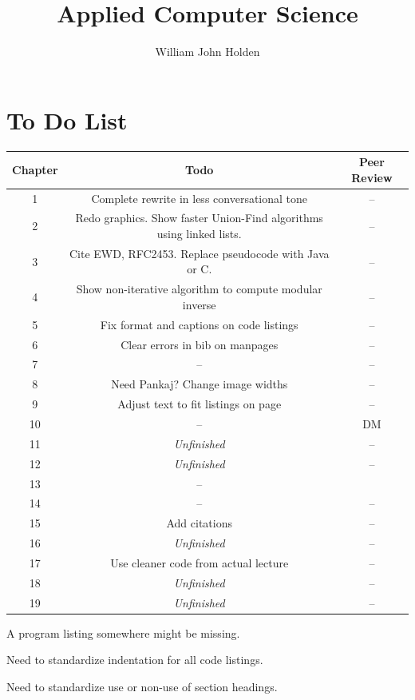 \documentclass{book}
\title{Applied Computer Science}
\author{William John Holden}
\begin{document}
\frontmatter
\maketitle
\tableofcontents

\chapter{To Do List}

\begin{center}
\begin{tabular}{c | c | c}
Chapter & Todo & Peer Review \\
\hline
1 & Complete rewrite in less conversational tone & -- \\
2 & Redo graphics. Show faster Union-Find algorithms using linked lists. & -- \\
3 & Cite EWD, RFC2453. Replace pseudocode with Java or C. & -- \\
4 & Show non-iterative algorithm to compute modular inverse  & -- \\
5 & Fix format and captions on code listings & -- \\
6 & Clear errors in bib on manpages & -- \\
7 & -- & -- \\
8 & Need Pankaj? Change image widths & -- \\
9 & Adjust text to fit listings on page & -- \\
10 & -- & DM \\
11 & \textit{Unfinished} & -- \\
12 & \textit{Unfinished} & -- \\
13 & -- &  \\
14 & -- & -- \\
15 & Add citations & -- \\
16 & \textit{Unfinished} & -- \\
17 & Use cleaner code from actual lecture & -- \\
18 & \textit{Unfinished} & -- \\
19 & \textit{Unfinished} & -- \\
\end{tabular}
\end{center}

A program listing somewhere might be missing.

Need to standardize indentation for all code listings.

Need to standardize use or non-use of section headings.
\end{document}
